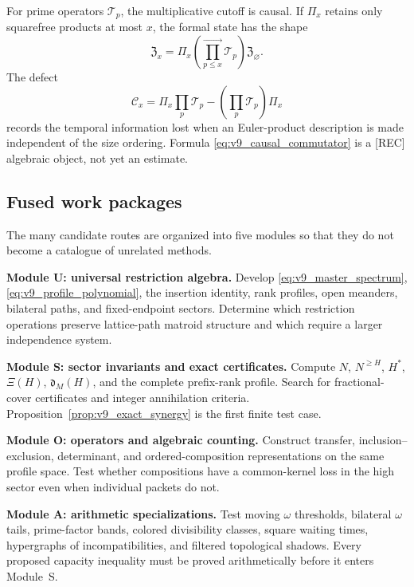 \documentclass[11pt]{amsart}
\numberwithin{equation}{section}
\theoremstyle{plain}
\theoremstyle{definition}
\theoremstyle{remark}
\begin{document}
For prime operators $\mathscr T_p$, the multiplicative cutoff is causal.  If
$\Pi_x$ retains only squarefree products at most $x$, the formal state has the
shape
\begin{equation}
\mathfrak Z_x
=\Pi_x\left(\prod_{p\le x}^{\longrightarrow}\mathscr T_p\right)
\mathfrak Z_{\varnothing}.
\label{eq:v9_prime_operator_cutoff}
\end{equation}
The defect
\begin{equation}
\mathscr C_x
=\Pi_x\prod_p\mathscr T_p-\left(\prod_p\mathscr T_p\right)\Pi_x
\label{eq:v9_causal_commutator}
\end{equation}
records the temporal information lost when an Euler-product description is
made independent of the size ordering.  Formula \eqref{eq:v9_causal_commutator}
is a \textup{[REC]} algebraic object, not yet an estimate.

\subsection{Fused work packages}

The many candidate routes are organized into five modules so that they do not
become a catalogue of unrelated methods.

\medskip\noindent\textbf{Module U: universal restriction algebra.}
Develop \eqref{eq:v9_master_spectrum}, \eqref{eq:v9_profile_polynomial}, the
insertion identity, rank profiles, open meanders, bilateral paths, and
fixed-endpoint sectors.  Determine which restriction operations preserve
lattice-path matroid structure and which require a larger independence system.

\medskip\noindent\textbf{Module S: sector invariants and exact certificates.}
Compute $N$, $N^{\ge H}$, $H^*$, $\Xi(H)$, $\mathfrak d_M(H)$, and the complete
prefix-rank profile.  Search for fractional-cover certificates and integer
annihilation criteria.  Proposition~\ref{prop:v9_exact_synergy} is the first
finite test case.

\medskip\noindent\textbf{Module O: operators and algebraic counting.}
Construct transfer, inclusion--exclusion, determinant, and ordered-composition
representations on the same profile space.  Test whether compositions have a
common-kernel loss in the high sector even when individual packets do not.

\medskip\noindent\textbf{Module A: arithmetic specializations.}
Test moving $\omega$ thresholds, bilateral $\omega$ tails, prime-factor bands,
colored divisibility classes, square waiting times, hypergraphs of
incompatibilities, and filtered topological shadows.  Every proposed capacity
inequality must be proved arithmetically before it enters Module~S.
\end{document}
